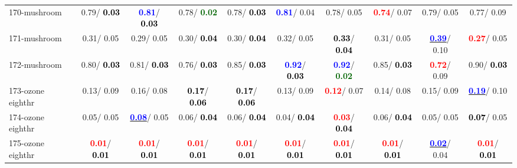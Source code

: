\begin{table}[h]
\begin{center}
{\begin{tabular}{lc|c|c|c|c|c|c|c|c}
170-mushroom &   0.79/\textcolor{black}{\textbf{  0.03}} & \textcolor{blue}{\textbf{  0.81}}/\textcolor{black}{\textbf{  0.03}} &   0.78/\textcolor{darkgreen}{\textbf{  0.02}} &   0.78/\textcolor{black}{\textbf{  0.03}} & \textcolor{blue}{\textbf{  0.81}}/  0.04 &   0.78/  0.05 & \textcolor{red}{\textbf{  0.74}}/  0.07 &   0.79/  0.05 &   0.77/  0.09 \\
171-mushroom &   0.31/  0.05 &   0.29/  0.05 &   0.30/\textcolor{black}{\textbf{  0.04}} &   0.30/\textcolor{black}{\textbf{  0.04}} &   0.32/  0.05 & \textcolor{black}{\textbf{  0.33}}/\textcolor{black}{\textbf{  0.04}} &   0.31/  0.05 & \underline{\textcolor{blue}{\textbf{  0.39}}}/  0.10 & \textcolor{red}{\textbf{  0.27}}/  0.05 \\
172-mushroom &   0.80/\textcolor{black}{\textbf{  0.03}} &   0.81/\textcolor{black}{\textbf{  0.03}} &   0.76/\textcolor{black}{\textbf{  0.03}} &   0.85/\textcolor{black}{\textbf{  0.03}} & \textcolor{blue}{\textbf{  0.92}}/\textcolor{black}{\textbf{  0.03}} & \textcolor{blue}{\textbf{  0.92}}/\textcolor{darkgreen}{\textbf{  0.02}} &   0.85/\textcolor{black}{\textbf{  0.03}} & \textcolor{red}{\textbf{  0.72}}/  0.09 &   0.90/\textcolor{black}{\textbf{  0.03}} \\
173-ozone eighthr &   0.13/  0.09 &   0.16/  0.08 & \textcolor{black}{\textbf{  0.17}}/\textcolor{black}{\textbf{  0.06}} & \textcolor{black}{\textbf{  0.17}}/\textcolor{black}{\textbf{  0.06}} &   0.13/  0.09 & \textcolor{red}{\textbf{  0.12}}/  0.07 &   0.14/  0.08 &   0.15/  0.09 & \underline{\textcolor{blue}{\textbf{  0.19}}}/  0.10 \\
174-ozone eighthr &   0.05/  0.05 & \underline{\textcolor{blue}{\textbf{  0.08}}}/  0.05 &   0.06/\textcolor{black}{\textbf{  0.04}} &   0.06/\textcolor{black}{\textbf{  0.04}} &   0.04/\textcolor{black}{\textbf{  0.04}} & \textcolor{red}{\textbf{  0.03}}/\textcolor{black}{\textbf{  0.04}} &   0.06/\textcolor{black}{\textbf{  0.04}} &   0.05/  0.05 & \textcolor{black}{\textbf{  0.07}}/  0.05 \\ \hline
175-ozone eighthr & \textcolor{red}{\textbf{  0.01}}/\textcolor{black}{\textbf{  0.01}} & \textcolor{red}{\textbf{  0.01}}/\textcolor{black}{\textbf{  0.01}} & \textcolor{red}{\textbf{  0.01}}/\textcolor{black}{\textbf{  0.01}} & \textcolor{red}{\textbf{  0.01}}/\textcolor{black}{\textbf{  0.01}} & \textcolor{red}{\textbf{  0.01}}/\textcolor{black}{\textbf{  0.01}} & \textcolor{red}{\textbf{  0.01}}/\textcolor{black}{\textbf{  0.01}} & \textcolor{red}{\textbf{  0.01}}/\textcolor{black}{\textbf{  0.01}} & \underline{\textcolor{blue}{\textbf{  0.02}}}/  0.04 & \textcolor{red}{\textbf{  0.01}}/\textcolor{black}{\textbf{  0.01}} \\

\end{tabular}}
\end{center}
\end{table}

